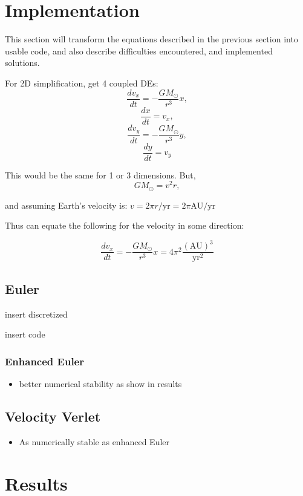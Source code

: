 \documentclass[12pt]{article}
\begin{document}
\section{Implementation}
This section will transform the equations described in the previous section into usable code, and also describe difficulties encountered, and implemented solutions.

For 2D simplification, get 4 coupled DEs:
\[
	\frac{dv_x}{dt}=-\frac{GM_{\odot}}{r^3}x,
\]
\[
	\frac{dx}{dt}=v_x,
\]
\[
	\frac{dv_y}{dt}=-\frac{GM_{\odot}}{r^3}y,
\]
\[
	\frac{dy}{dt}=v_y
\]

This would be the same for 1 or 3 dimensions. But,
\[
	GM_{\odot}=v^2r,
	\]

and assuming Earth's velocity is:
$v = 2\pi r/\mathrm{yr}=2\pi\mathrm{AU}/\mathrm{yr}$

Thus can equate the following for the velocity in some direction:

\[
	\frac{dv_x}{dt} = -\frac{GM_{\odot}}{r^3}x = 4\pi^2 \frac{(\mathrm{AU})^3}{\mathrm{yr}^2}
\]

\subsection{Euler}
insert discretized

insert code

\subsubsection{Enhanced Euler}
\begin{itemize}
	\item better numerical stability as show in results
\end{itemize}

\subsection{Velocity Verlet}
\begin{itemize}
	\item As numerically stable as enhanced Euler
\end{itemize}











\section{Results}
\end{document}
